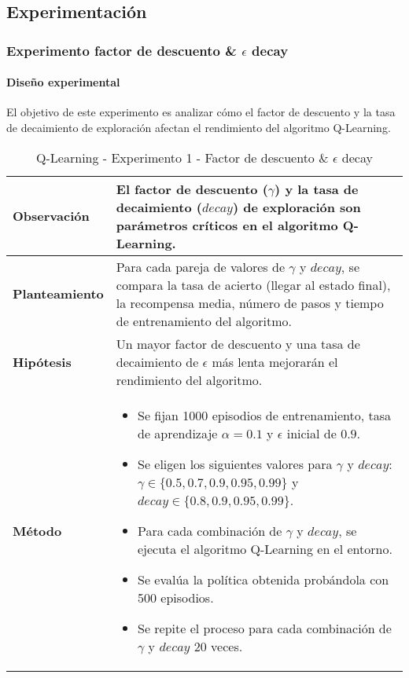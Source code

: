 \subsection{Experimentación}

\subsubsection{Experimento factor de descuento \& \(\epsilon\) decay}

\paragraph{Diseño experimental}

El objetivo de este experimento es analizar cómo el factor de descuento y la tasa de decaimiento de exploración afectan el rendimiento del algoritmo Q-Learning.

\begin{table}[H]
    \centering
    \begin{tabularx}{\textwidth}{|p{4cm}|X|} %
        \hline %
        \textbf{Observación} & El factor de descuento ($\gamma$) y la tasa de decaimiento ($decay$) de exploración son parámetros críticos en el algoritmo Q-Learning. 
        \\ \hline 
        \textbf{Planteamiento} & Para cada pareja de valores de $\gamma$ y $decay$, se compara la tasa de acierto (llegar al estado final), la recompensa media, número de pasos y tiempo de entrenamiento del algoritmo.
        \\ \hline 
        \textbf{Hipótesis} & Un mayor factor de descuento y una tasa de decaimiento de $\epsilon$ más lenta mejorarán el rendimiento del algoritmo.
        \\ \hline 
        \textbf{Método} & 
        \begin{itemize}
            \item Se fijan 1000 episodios de entrenamiento, tasa de aprendizaje \(\alpha = 0.1\) y \(\epsilon\) inicial de $0.9$.
            \item Se eligen los siguientes valores para \(\gamma\) y $decay$: \(\gamma \in \{0.5, 0.7, 0.9, 0.95, 0.99\}\) y $decay \in \{0.8, 0.9, 0.95, 0.99\}$.
            \item Para cada combinación de \(\gamma\) y $decay$, se ejecuta el algoritmo Q-Learning en el entorno.
            \item Se evalúa la política obtenida probándola con 500 episodios.
            \item Se repite el proceso para cada combinación de \(\gamma\) y $decay$ 20 veces.
        \end{itemize}
        \\ \hline
    \end{tabularx}
    \caption{Q-Learning - Experimento 1 - Factor de descuento \& $\epsilon$ decay}
    \label{tab:diseñoQLEarningExp1}
\end{table}

